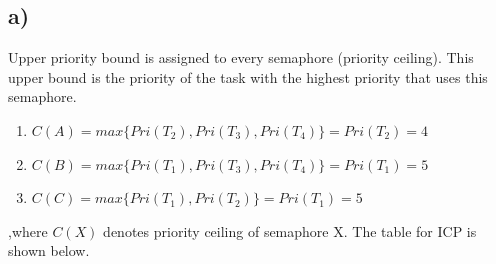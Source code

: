 \documentclass[10pt,a4paper]{article}
\begin{document}
\subsection*{a)}
Upper priority bound is assigned to every semaphore (priority ceiling). This upper bound is the priority of the task with the highest priority that uses this semaphore.
\begin{enumerate}
    \item $C(A) = max\{Pri(T_{2}), Pri(T_{3}), Pri(T_{4})\} = Pri(T_2) = 4$
    \item $C(B) = max\{Pri(T_{1}), Pri(T_{3}), Pri(T_{4})\} = Pri(T_1) = 5$
    \item $C(C) = max\{Pri(T_{1}), Pri(T_{2})\} = Pri(T_1) = 5$
\end{enumerate}
,where $C(X)$ denotes priority ceiling of semaphore X.
The table for ICP is shown below.
\end{document}
